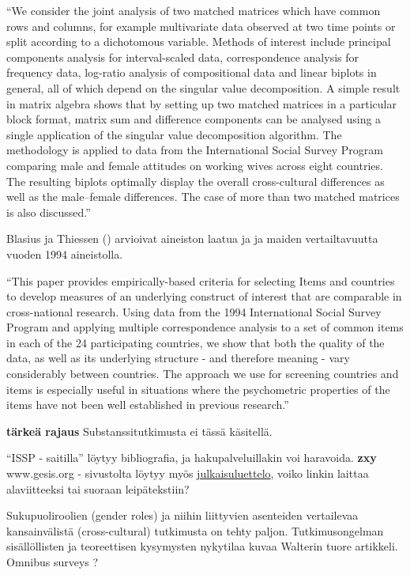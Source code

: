 \documentclass[
  finnish,
]{book}
\begin{document}
``We consider the joint analysis of two matched matrices which have common
rows and columns, for example multivariate data observed at two time points or split
according to a dichotomous variable. Methods of interest include principal components
analysis for interval-scaled data, correspondence analysis for frequency data, log-ratio
analysis of compositional data and linear biplots in general, all of which depend on the
singular value decomposition. A simple result in matrix algebra shows that by setting up
two matched matrices in a particular block format, matrix sum and difference components
can be analysed using a single application of the singular value decomposition algorithm.
The methodology is applied to data from the International Social Survey Program
comparing male and female attitudes on working wives across eight countries. The resulting
biplots optimally display the overall cross-cultural differences as well as the male--female
differences. The case of more than two matched matrices is also discussed.''

Blasius ja Thiessen (\citep{RefWorks:doc:5b15542ee4b0e2616bc42dca}) arvioivat aineiston laatua ja ja maiden vertailtavuutta vuoden 1994 aineistolla.

``This paper provides empirically-based criteria for selecting Items and countries to develop measures of an underlying construct of interest that are comparable in cross-national research. Using data from the 1994 International Social Survey Program and applying multiple correspondence analysis to a set of common items in each of the 24 participating countries, we show that both the quality of the data, as well as its underlying structure - and therefore meaning - vary considerably between countries. The approach we use for screening countries and items is especially useful in situations where the psychometric properties of the items have not been well established in previous research.''

\textbf{tärkeä rajaus} Substanssitutkimusta ei tässä käsitellä.

``ISSP - saitilla'' löytyy bibliografia, ja hakupalveluillakin voi haravoida.
\textbf{zxy} www.gesis.org - sivustolta löytyy myös \href{https://search.gesis.org/research_data/ZA5900}{julkaisuluettelo}, voiko linkin laittaa alaviitteeksi tai suoraan leipätekstiin?

Sukupuoliroolien (gender roles) ja niihin liittyvien asenteiden vertailevaa kansainvälistä (cross-cultural) tutkimusta on tehty paljon. Tutkimusongelman sisällöllisten ja teoreettisen kysymysten nykytilaa kuvaa Walterin\citep{RefWorks:doc:5bd08fb6e4b05c5447c9a9f9} tuore artikkeli. Omnibus surveys ?
\end{document}
